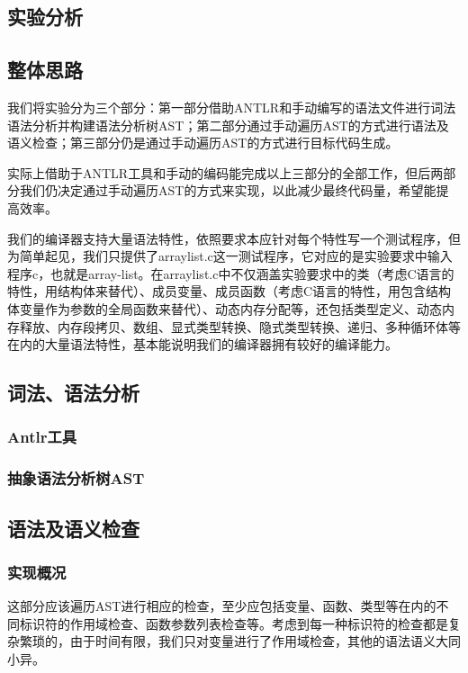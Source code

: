 \documentclass[a4paper]{article}
\begin{document}
\begin{CJK*}{UTF8}{gbsn}
    \section{实验分析}
    \subsection{整体思路}
    我们将实验分为三个部分：第一部分借助ANTLR和手动编写的语法文件进行词法语法分析并构建语法分析树AST；第二部分通过手动遍历AST的方式进行语法及语义检查；第三部分仍是通过手动遍历AST的方式进行目标代码生成。
    \par 实际上借助于ANTLR工具和手动的编码能完成以上三部分的全部工作，但后两部分我们仍决定通过手动遍历AST的方式来实现，以此减少最终代码量，希望能提高效率。
    \par 我们的编译器支持大量语法特性，依照要求本应针对每个特性写一个测试程序，但为简单起见，我们只提供了arraylist.c这一测试程序，它对应的是实验要求中输入程序c，也就是array-list。在arraylist.c中不仅涵盖实验要求中的类（考虑C语言的特性，用结构体来替代）、成员变量、成员函数（考虑C语言的特性，用包含结构体变量作为参数的全局函数来替代）、动态内存分配等，还包括类型定义、动态内存释放、内存段拷贝、数组、显式类型转换、隐式类型转换、递归、多种循环体等在内的大量语法特性，基本能说明我们的编译器拥有较好的编译能力。

    \subsection{词法、语法分析}

    \subsubsection{Antlr工具}

    \subsubsection{抽象语法分析树AST}

    \subsection{语法及语义检查}
    \subsubsection{实现概况}
    这部分应该遍历AST进行相应的检查，至少应包括变量、函数、类型等在内的不同标识符的作用域检查、函数参数列表检查等。考虑到每一种标识符的检查都是复杂繁琐的，由于时间有限，我们只对变量进行了作用域检查，其他的语法语义大同小异。


\end{CJK*}
\end{document}
